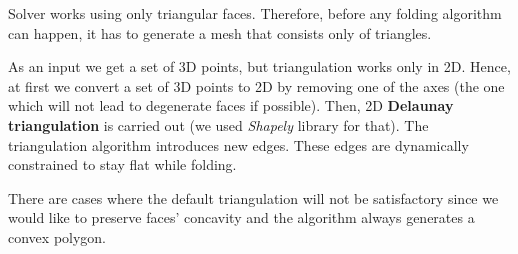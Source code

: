 Solver works using only triangular faces.
Therefore, before any folding algorithm can happen, it has to generate a mesh that consists only of triangles.
\begin{figure}[H]
    \centering
    \qquad
\end{figure}

As an input we get a set of 3D points, but triangulation works only in 2D.
Hence, at first we convert a set of 3D points to 2D by removing one of the axes (the one which will not lead to degenerate faces if possible).
Then, 2D \textbf{Delaunay triangulation} is carried out (we used \textit{Shapely} library for that).
The triangulation algorithm introduces new edges. These edges are dynamically constrained to stay flat while folding.

There are cases where the default triangulation will not be satisfactory
since we would like to preserve faces' concavity and the algorithm always generates a convex polygon.

